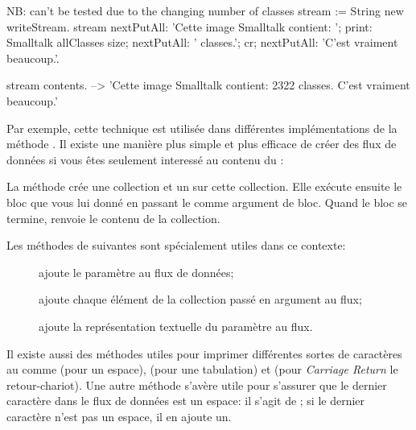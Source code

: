 \documentclass[a4paper,10pt,twoside]{book}
\begin{document}
\begin{code}{NB: can't be tested due to the changing number of classes}
stream := String new writeStream.
stream
  nextPutAll: 'Cette image Smalltalk contient: ';
  print: Smalltalk allClasses size;
  nextPutAll: ' classes.';
  cr;
  nextPutAll: 'C'est vraiment beaucoup.'.

stream contents. --> 'Cette image Smalltalk contient: 2322 classes. C'est vraiment beaucoup.'
\end{code}

Par exemple, cette technique est utilisée dans différentes 
implémentations de la méthode . Il existe une manière
plus simple et plus efficace de créer des flux de données si vous êtes
seulement interessé au contenu du \stream:


La méthode   crée une collection et un \stream sur cette collection.
Elle exécute ensuite le bloc que vous lui donné en passant le \stream comme argument de bloc. Quand le bloc se termine, 
renvoie le contenu de la collection.

Les méthodes de  suivantes sont spécialement utiles dans ce contexte:

\begin{description}
\item[] ajoute le paramètre au flux de données;
\item[] ajoute chaque élément de la collection passé en argument au flux;
\item[] ajoute la représentation textuelle du paramètre au flux.
\end{description}

Il existe aussi des méthodes utiles pour imprimer différentes sortes
de caractères au \stream comme  (pour un espace), 
    (pour une tabulation) et
    (pour \emph{Carriage Return} \cad le retour-chariot).
Une autre méthode s'avère utile pour s'assurer que le dernier caractère
dans le flux de données est un espace: il s'agit de ; si le dernier caractère n'est pas un espace, il en ajoute un.
\end{document}
